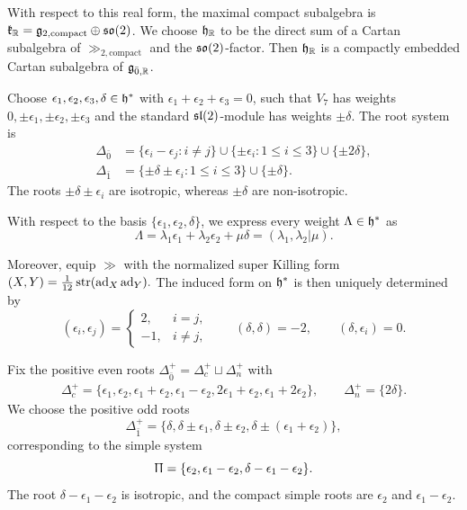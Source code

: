 With respect to this real form, the maximal compact subalgebra is $\kk_{\RR}
=
\gg_{2,\mathrm{compact}}\oplus\so(2)$. We choose $\hh_{\RR}$ to be the direct sum of a Cartan subalgebra of $\gg_{2,\mathrm{compact}}$ and the $\so(2)$-factor. Then $\hh_{\RR}$ is a compactly embedded Cartan subalgebra of $\gg_{\bar0,\RR}$.

Choose $\epsilon_1,\epsilon_2,\epsilon_3,\delta\in\hh^*$ with $\epsilon_1+\epsilon_2+\epsilon_3=0$, such that $V_7$ has weights $0,\pm\epsilon_1,\pm\epsilon_2,\pm\epsilon_3$ and the standard $\sl(2)$-module has weights $\pm\delta$. The root system is
\begin{equation}
\begin{aligned}
\Delta_{\bar0}
&=
\{\epsilon_i-\epsilon_j:i\neq j\}
\cup\{\pm\epsilon_i:1\leq i\leq3\}
\cup\{\pm2\delta\},\\
\Delta_{\bar1}
&=
\{\pm\delta\pm\epsilon_i:1\leq i\leq3\}
\cup\{\pm\delta\}.
\end{aligned}
\label{eq::G3_roots}
\end{equation}
The roots $\pm\delta\pm\epsilon_i$ are isotropic, whereas $\pm\delta$ are non-isotropic. 

With respect to the basis $\{\epsilon_{1},\epsilon_{2},\delta\}$, we express every weight $\Lambda \in \hh^{\ast}$ as
\begin{equation}
\Lambda
=
\lambda_1\epsilon_1+\lambda_2\epsilon_2+\mu\delta
=
(\lambda_1,\lambda_2\vert\mu).
\end{equation}

Moreover, equip $\gg$ with the normalized super Killing form
$
(X,Y)=\tfrac1{12}\str(\ad_X\ad_Y).
$
The induced form on $\hh^*$ is then uniquely determined by
\begin{equation}
(\epsilon_i,\epsilon_j)=
\begin{cases}
2,&i=j,\\
-1,&i\neq j,
\end{cases}
\qquad
(\delta,\delta)=-2,
\qquad
(\delta,\epsilon_i)=0.
\end{equation}


Fix the positive even roots $\Delta_{\bar0}^+=\Delta_c^+\sqcup\Delta_n^+$ with
\begin{equation}
\begin{aligned}
\Delta_c^+
=
\{\epsilon_1,\epsilon_2,\epsilon_1+\epsilon_2,
\epsilon_1-\epsilon_2,2\epsilon_1+\epsilon_2,
\epsilon_1+2\epsilon_2\},\qquad 
\Delta_n^+
=\{2\delta\}.
\end{aligned}
\label{eq::G3_positive_even_roots}
\end{equation}
We choose the positive odd roots
\begin{equation}
\Delta_{\bar1}^+
=
\{\delta,\delta\pm\epsilon_1,\delta\pm\epsilon_2,
\delta\pm(\epsilon_1+\epsilon_2)\},
\end{equation}
corresponding to the simple system
\begin{equation}\label{eq::simple_system_G(3)}
\Uppi
=
\{\epsilon_2,\epsilon_1-\epsilon_2,
\delta-\epsilon_1-\epsilon_2\}.
\end{equation}
The root $\delta-\epsilon_1-\epsilon_2$ is isotropic, and the compact simple roots are $\epsilon_2$ and $\epsilon_1-\epsilon_2$.


